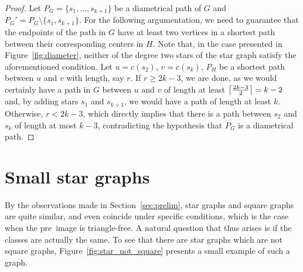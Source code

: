 \begin{proof}
    Let $P_G = \{s_1, \dots, s_{k+1}\}$ be a diametrical path of $G$ and $P_G' = P_G \setminus \{s_1, s_{k+1}\}$.
    For the following argumentation, we need to guarantee that the endpoints of the path in $G$ have at least two vertices in a shortest path between their corresponding centers in $H$.
    Note that, in the case presented in Figure~\ref{fig:diameter}, neither of the degree two stars of the star graph satisfy the aforementioned condition.
    Let $u = c(s_2)$, $v = c(s_k)$, $P_H$ be a shortest path between $u$ and $v$ with length, say $r$.
    If $r \geq 2k - 3$, we are done, as we would certainly have a path in $G$ between $u$ and $v$ of length at least $\left\lceil\frac{2k-3}{2}\right\rceil = k-2$ and, by adding stars $s_1$ and $s_{k+1}$, we would have a path of length at least $k$.
    Otherwise, $r < 2k - 3$, which directly implies that there is a path between $s_2$ and $s_k$ of length at most $k-3$, contradicting the hypothesis that $P_G$ is a diametrical path.
\end{proof}

\section{Small star graphs}


By the observations made in Section~\ref{sec:prelim}, star graphs and square graphs are quite similar, and even coincide under specific conditions, which is the case when the pre~image is triangle-free.
A natural question that thus arises is if the classes are actually the same.
To see that there are star graphs which are not square graphs, Figure~\ref{fig:star_not_square} presents a small example of such a graph.

